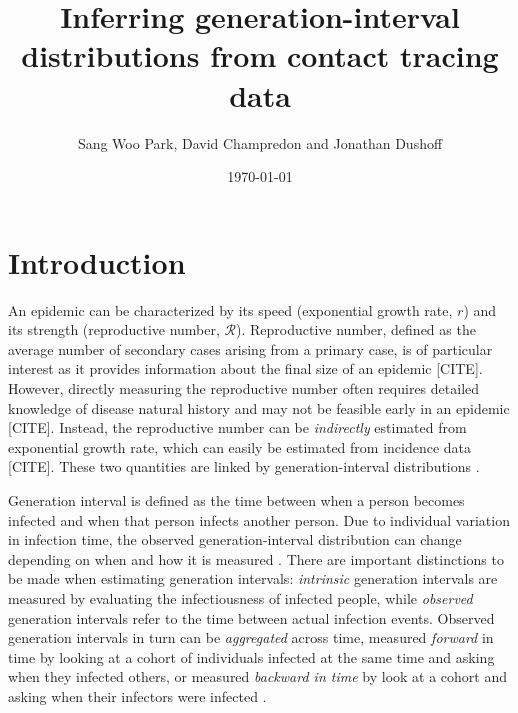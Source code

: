 \documentclass{article}
\title{Inferring generation-interval distributions from contact tracing data}
\author{Sang Woo Park, David Champredon and Jonathan Dushoff}
\date{\today}
\newcommand{\RR}{\ensuremath{{\mathcal R}}}
\begin{document}
\maketitle

\section{Introduction}

An epidemic can be characterized by its speed (exponential growth rate, $r$) and its strength (reproductive number, \RR).
Reproductive number, defined as the average number of secondary cases arising from a primary case, is of particular interest as it provides information about the final size of an epidemic [CITE].
However, directly measuring the reproductive number often requires detailed knowledge of disease natural history and may not be feasible early in an epidemic [CITE].
Instead, the reproductive number can be \emph{indirectly} estimated from exponential growth rate, which can easily be estimated from incidence data [CITE].
These two quantities are linked by generation-interval distributions \citep{wallinga2007generation}.

Generation interval is defined as the time between when a person becomes infected and when that person infects another person.
Due to individual variation in infection time, the observed generation-interval distribution can change depending on when and how it is measured \citep{svensson2007note, kenah2008generation, nishiura2010time}.
There are important distinctions to be made when estimating generation intervals: \emph{intrinsic} generation intervals are measured by evaluating the infectiousness of infected people,
while \emph{observed} generation intervals refer to the time between actual infection events.
Observed generation intervals in turn can be \emph{aggregated} across time, measured \emph{forward} in time by looking at a cohort of individuals infected at the same time and asking when they infected others, or measured \emph{backward in time} by look at a cohort and asking when their infectors were infected \citep{champredon2015intrinsic}.
\end{document}
